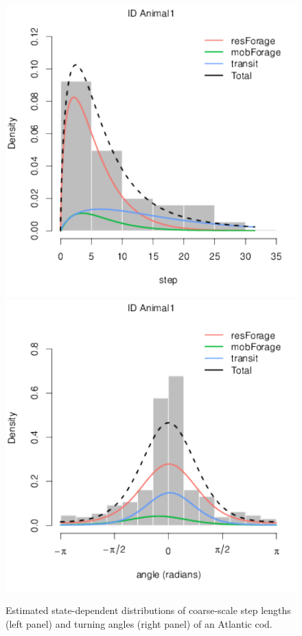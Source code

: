 \documentclass[12pt]{article}\usepackage[]{graphicx}\usepackage[]{color}
\begin{document}
\begin{figure}[htbp]
  \centering
  \includegraphics[width=.49\textwidth]{plot_codExample001.pdf}
  \includegraphics[width=.49\textwidth]{plot_codExample002.pdf}
  \caption{Estimated state-dependent distributions of coarse-scale step lengths (left panel) and turning angles (right panel) of an Atlantic
cod.}
  \label{fig:codDists}
\end{figure}
\end{document}
